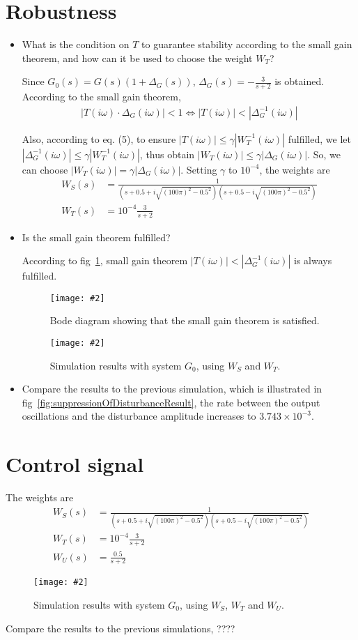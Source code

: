 \documentclass[11pt,a4paper]{article}
\newcommand{\image}[3]{
	\begin{figure}[!ht]
		\centering
	    \texttt{[image: \#2]}
		\caption{#3}
		\label{fig:#2}
	\end{figure}
}
\begin{document}
\section*{Robustness}
	\begin{itemize}
		\item What is the condition on $T$ to guarantee stability according to the small gain theorem, and how can it be used to choose the weight $W_T$?
		\par Since $G_{0}(s) = G(s)(1 + \Delta_{G}(s))$, $\Delta_{G}(s) = -\frac{3}{s+2}$ is obtained. According to the small gain theorem,
			\begin{align*}
				|T(i\omega)\cdot\Delta_{G}(i\omega)| < 1 \Leftrightarrow |T(i\omega)| < |\Delta^{-1}_{G}(i\omega)|
			\end{align*}
		\par Also, according to eq. (5), to ensure $|T(i\omega)| \leq \gamma |W^{-1}_{T}(i\omega)|$ fulfilled, we let $|\Delta^{-1}_{G}(i\omega)| \leq \gamma |W^{-1}_{T}(i\omega)|$, thus obtain $ |W_{T}(i\omega)| \leq \gamma |\Delta_{G}(i\omega)| $. So, we can choose $ |W_{T}(i\omega)| = \gamma |\Delta_{G}(i\omega)| $. Setting $\gamma$ to $10^{-4}$, the weights are
			\begin{align*}
				W_S(s) &= \frac{1}{(s+0.5+i\sqrt{(100\pi)^{2}-0.5^{2}})(s+0.5-i\sqrt{(100\pi)^{2}-0.5^{2}})} \\
				W_T(s) &= 10^{-4}\frac{3}{s + 2}
			\end{align*}
			
		\item Is the small gain theorem fulfilled?
		\par According to fig~\ref{fig:robustnessBode}, small gain theorem $|T(i\omega)| < |\Delta^{-1}_{G}(i\omega)|$ is always fulfilled.
			\image{0.75}{robustnessBode}{Bode diagram showing that the small gain theorem is satisfied.}
			\image{0.75}{robustnessResult}{Simulation results with system $G_0$, using $W_S$ and $W_T$.}
		
		\item Compare the results to the previous simulation, which is illustrated in fig~\ref{fig:suppressionOfDisturbanceResult}, the rate between the output oscillations and the disturbance amplitude increases to $3.743\times 10^{-3}$.
	\end{itemize}



\section*{Control signal}
\par The weights are
	\begin{align*}
		W_S(s) &= \frac{1}{(s+0.5+i\sqrt{(100\pi)^{2}-0.5^{2}})(s+0.5-i\sqrt{(100\pi)^{2}-0.5^{2}})} \\
		W_T(s) &= 10^{-4}\frac{3}{s + 2} \\
		W_U(s) &= \frac{0.5}{s + 2}
	\end{align*}

	\image{1}{controlSignalResult}{Simulation results with system $G_0$, using $W_S$, $W_T$ and $W_U$.}

\par Compare the results to the previous simulations, ????
\end{document}
